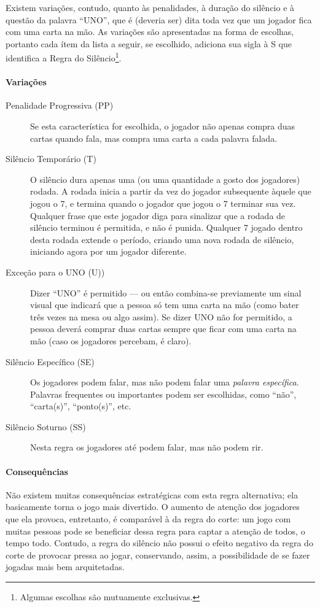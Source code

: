 Existem variações, contudo, quanto às penalidades, à duração do silêncio e à questão da palavra ``UNO'', que é (deveria ser) dita toda vez que um jogador fica com uma carta na mão. As variações são apresentadas na forma de escolhas, portanto cada ítem da lista a seguir, se escolhido, adiciona sua sigla à S que identifica a Regra do Silêncio\footnote{Algumas escolhas são mutuamente exclusivas.}.

\paragraph{Variações}

\begin{description}
\item[Penalidade Progressiva (PP)]{Se esta característica for escolhida, o jogador não apenas compra duas cartas quando fala, mas compra uma carta a cada palavra falada.}
\item[Silêncio Temporário (T)]{O silêncio dura apenas uma (ou uma quantidade a gosto dos jogadores) rodada. A rodada inicia a partir da vez do jogador subsequente àquele que jogou o 7, e termina quando o jogador que jogou o 7 terminar sua vez. Qualquer frase que este jogador diga para sinalizar que a rodada de silêncio terminou é permitida, e não é punida. Qualquer 7 jogado dentro desta rodada extende o período, criando uma nova rodada de silêncio, iniciando agora por um jogador diferente.}
\item[Exceção para o UNO (U))]{Dizer ``UNO'' é permitido --- ou então combina-se previamente um sinal visual que indicará que a pessoa só tem uma carta na mão (como bater três vezes na mesa ou algo assim). Se dizer UNO não for permitido, a pessoa deverá comprar duas cartas sempre que ficar com uma carta na mão (caso os jogadores percebam, é claro).}
\item[Silêncio Específico (SE)]{Os jogadores podem falar, mas não podem falar uma \emph{palavra específica}. Palavras frequentes ou importantes podem ser escolhidas, como ``não'', ``carta(s)'', ``ponto(s)'', etc.}
\item[Silêncio Soturno (SS)]{Nesta regra os jogadores até podem falar, mas não podem rir.}
\end{description}

\paragraph{Consequências}

Não existem muitas consequências estratégicas com esta regra alternativa; ela basicamente torna o jogo mais divertido. O aumento de atenção dos jogadores que ela provoca, entretanto, é comparável à da regra do corte: um jogo com muitas pessoas pode se beneficiar dessa regra para captar a atenção de todos, o tempo todo. Contudo, a regra do silêncio não possui o efeito negativo da regra do corte de provocar pressa ao jogar, conservando, assim, a possibilidade de se fazer jogadas mais bem arquitetadas.

